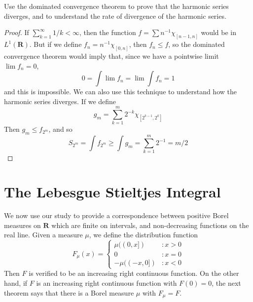 \begin{exercise}[Tao]
    Use the dominated convergence theorem to prove that the harmonic series diverges, and to understand the rate of divergence of the harmonic series.
\end{exercise}
\begin{proof}
    If $\sum_{k = 1}^\infty 1/k < \infty$, then the function $f = \sum n^{-1} \chi_{[n-1,n]}$ would be in $L^1(\mathbf{R})$. But if we define $f_n = n^{-1} \chi_{[0,n]}$, then $f_n \leq f$, so the dominated convergence theorem would imply that, since we have a pointwise limit $\lim f_n = 0$,
    \[ 0 = \int \lim f_n = \lim \int f_n = 1 \]
    and this is impossible. We can also use this technique to understand how the harmonic series diverges. If we define
    \[ g_m = \sum_{k = 1}^m 2^{-k} \chi_{[2^{k-1}, 2^k]} \]
    Then $g_m \leq f_{2^m}$, and so
    \[ S_{2^m} = \int f_{2^m} \geq \int g_m = \sum_{k = 1}^m 2^{-1} = m/2 \]
\end{proof}

\chapter{The Lebesgue Stieltjes Integral}

We now use our study to provide a correspondence between positive Borel measures on $\mathbf{R}$ which are finite on intervals, and non-decreasing functions on the real line. Given a measure $\mu$, we define the distribution function
%
\[ F_\mu(x) = \begin{cases} \mu((0,x]) & : x > 0 \\ 0 & : x = 0\\ - \mu((-x, 0]) & : x < 0 \end{cases} \]
%
Then $F$ is verified to be an increasing right continuous function. On the other hand, if $F$ is an increasing right continuous function with $F(0) = 0$, the next theorem says that there is a Borel measure $\mu$ with $F_\mu = F$.


